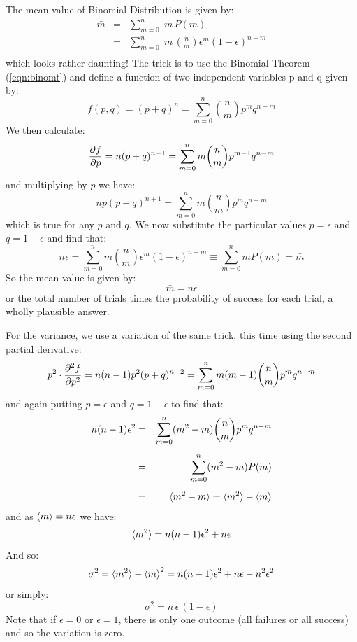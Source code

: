 \documentclass[12pt,oneside]{book}
\begin{document}
The mean value of Binomial Distribution is given by:
\begin{eqnarray*}
\bar{m} &=& \sum_{m=0}^n \; m \, P(m) \\
&=& \sum_{m=0}^n \; m \, \binom{n}{m} \epsilon^m (1-\epsilon)^{n-m} \\
\end{eqnarray*}
which looks rather daunting!  The trick is to use the Binomial Theorem (\ref{eqn:binomt}) and define a function of two independent variables p and q given by:
\begin{displaymath}
f(p,q) = (p+q)^n = \sum_{m=0}^n \binom{n}{m} p^m q^{n-m}
\end{displaymath}
We then calculate:
\begin{displaymath}
\frac{\partial f}{\partial p} = n(p+q)^{n-1} = \sum_{m=0}^n m \binom{n}{m} p^{m-1} q^{n-m} \\
\end{displaymath}
and multiplying by $p$ we have:
\begin{displaymath}
np(p+q)^{n+1} = \sum_{m=0}^n m \binom{n}{m} p^m q^{n-m}
\end{displaymath}
which is true for any $p$ and $q$.  We now substitute the particular values $p=\epsilon$ and $q=1-\epsilon$ and find that:
\begin{displaymath}
n \epsilon = \sum_{m=0}^n m \binom{n}{m} \epsilon^m (1-\epsilon)^{n-m} \equiv \sum_{m=0}^n m P(m) = \bar{m}
\end{displaymath}
So the mean value is given by:
\begin{equation}
\bar{m} = n \epsilon
\end{equation}
or the total number of trials times the probability of success for each trial, a wholly plausible answer.

For the variance, we use a variation of the same trick, this time using the second partial derivative:
\begin{displaymath}
p^2 \cdot \frac{\partial^2 f}{\partial p^2} = n(n-1)p^2(p+q)^{n-2} = \sum_{m=0}^n m (m-1) \binom{n}{m} p^{m} q^{n-m} \\
\end{displaymath}
and again putting $p=\epsilon$ and $q=1-\epsilon$ to find that:
\begin{eqnarray*}
n(n-1)\epsilon^2 &=& \sum_{m=0}^n (m^2 -m) \binom{n}{m} p^{m} q^{n-m} \\[5pt]
&=& \sum_{m=0}^n (m^2 -m) P(m) \\[5pt]
&=& \braket{m^2-m} = \braket{m^2}-\braket{m}
\end{eqnarray*}
and as $\braket{m} = n \epsilon$ we have:
\begin{displaymath}
\braket{m^2} = n(n-1)\epsilon^2 + n \epsilon
\end{displaymath}
And so:
\begin{displaymath}
\sigma^2 = \braket{m^2} - \braket{m}^2 = n(n-1)\epsilon^2 + n \epsilon - n^2\epsilon^2
\end{displaymath}
or simply:
\begin{equation}
\sigma^2 = n \, \epsilon \, (1 - \epsilon)
\end{equation}
Note that if $\epsilon=0$ or $\epsilon=1$, there is only one outcome (all failures or all success) and so the variation is zero.
\end{document}
